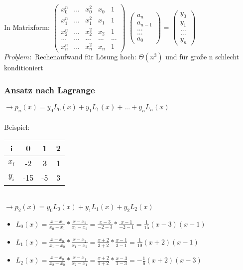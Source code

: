 \documentclass[10pt,landscape,a4paper]{article}
\begin{document}
\begin{multicols}{3}
In Matrixform:   
$
\begin{pmatrix}
	x_0^n & ... & x_0^2 & x_0 & 1\\
	x_1^n & ... & x_1^2 & x_1 & 1\\
	x_2^n & ... & x_2^2 & x_2 & 1\\
	... & ... & ... & ... & ...\\
	x_n^n & ... & x_n^2& x_n & 1
\end{pmatrix}
$
$
\begin{pmatrix}
	a_n \\
	a_{n-1} \\
	... \\
	... \\
	a_0
\end{pmatrix}
$
=
$
\begin{pmatrix}
	y_0 \\
	y_1 \\
	... \\
	... \\
	y_n
\end{pmatrix}
$ \\
$\underline{Problem}:$ Rechenaufwand für Lösung hoch: $\Theta (n^3)$ und für große n schlecht konditioniert

\subsubsection{Ansatz nach Lagrange}
$\rightarrow p_n(x) = y_0L_0(x) + y_1L_1(x) + ... + y_nL_n(x)$ \\ \\
Beispiel:
\begin{tabular}{c | c c c} 
 i & 0 & 1 & 2 \\ 
 \hline
 $x_i$ & -2 & 3 & 1 \\
 \hline
 $y_i$ & -15 & -5 & 3 
\end{tabular} \\

$\rightarrow p_2(x) = y_0L_0(x) + y_1L_1(x) + y_2L_2(x)$

\begin{itemize}
	\setlength\itemsep{-0.2em}
	\item $L_0(x) = \frac{x-x_1}{x_0-x_1} * \frac{x-x_2}{x_0-x_2} = \frac{x-3}{-2-3} * \frac{x-1}{-2-1} = \frac{1}{15}(x-3)(x-1)$
	\item $L_1(x) = \frac{x-x_0}{x_1-x_0} * \frac{x-x_2}{x_1-x_2} = \frac{x+2}{3+2} * \frac{x-1}{3-1} = \frac{1}{10}(x+2)(x-1)$
	\item $L_2(x) = \frac{x-x_0}{x_2-x_0} * \frac{x-x_1}{x_2-x_1} = \frac{x+2}{1+2} * \frac{x-3}{1-3} = -\frac{1}{6}(x+2)(x-3)$
\end{itemize}


\end{multicols}
\end{document}
